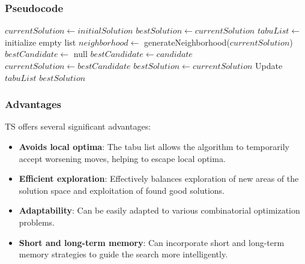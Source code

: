 \subsubsection{Pseudocode}


\begin{algorithm}
	\caption{Tabu Search for \Gls{TSP}}\label{alg:tabusearch}
	\begin{algorithmic}[1]
		\State $currentSolution \gets initialSolution$
		\State $bestSolution \gets currentSolution$
		\State $tabuList \gets$ initialize empty list
		\State $neighborhood \gets$ generateNeighborhood($currentSolution$)
		\State $bestCandidate \gets$ null
		\State $bestCandidate \gets candidate$
		\EndIf
		\EndFor
		\State $currentSolution \gets bestCandidate$
		\State $bestSolution \gets currentSolution$
		\EndIf
		\State Update $tabuList$
		\EndFor
		\State \Return $bestSolution$
		\EndProcedure
	\end{algorithmic}
\end{algorithm}

\subsubsection{Advantages}

\Gls{TS} offers several significant advantages:

\begin{itemize}
	\item \textbf{Avoids local optima}: The tabu list allows the algorithm to temporarily accept worsening moves, helping to escape local optima.
	\item \textbf{Efficient exploration}: Effectively balances exploration of new areas of the solution space and exploitation of found good solutions.
	\item \textbf{Adaptability}: Can be easily adapted to various combinatorial optimization problems.
	\item \textbf{Short and long-term memory}: Can incorporate short and long-term memory strategies to guide the search more intelligently.
\end{itemize}

